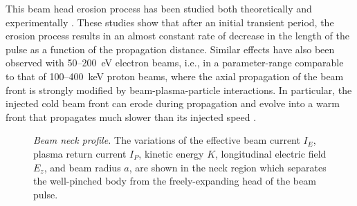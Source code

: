 \documentclass [12pt,a4paper,     ]{report} %
\begin{document}
	This beam head erosion process has been studied both theoretically and experimentally \cite{CHAMB1979A, LEE--1980A, SHARP1980-, GREEN1985-, BOUCH1988-, GLAZY1990-, ROSE-2002-}.  These studies show that after an initial transient period, the erosion process results in an almost constant rate of decrease in the length of the pulse as a function of the propagation distance.  Similar effects have also been observed with 50--200~eV electron beams, i.e., in a parameter-range comparable to that of 100--400~keV proton beams, where the axial propagation of the beam front is strongly modified by beam-plasma-particle interactions.  In particular, the injected cold beam front can erode during propagation and evolve into a warm front that propagates much slower than its injected speed \cite{CHAN-1991-,CHAN-1994-}.


%
\begin{figure}
\begin{center}
\caption[Beam neck profile]{\emph{Beam neck profile.} The variations of the effective beam current $I_E$, plasma return current $I_P$, kinetic energy $K$, longitudinal electric field $E_z$, and beam radius $a$, are shown in the neck region which separates the well-pinched body from the freely-expanding head of the beam pulse.   
\label{fig:nec}}
\end{center}
\end{figure}
%
\end{document}
